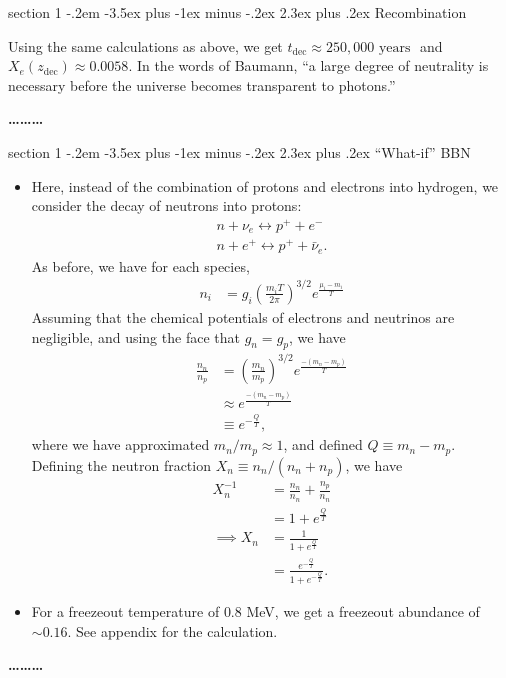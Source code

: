 \documentclass[12pt]{article}
\makeatletter
\newenvironment{problem}{\@startsection
	{section}
	{1}
	{-.2em}
	{-3.5ex plus -1ex minus -.2ex}
	{2.3ex plus .2ex}
	{\pagebreak[3]%
		\large\bf\noindent{Problem }
	}
}
{%
	\begin{center}\large\bf \ldots\ldots\ldots\end{center}}
\makeatother
\begin{document}
\begin{problem}{Recombination}
\begin{enumerate}
			Using the same calculations as above, we get $\boxed{t_\mathrm{dec}\approx 250,000 \text{ years }}$ and $X_e(z_\mathrm{dec})\approx \boxed{0.0058}$.  In the words of Baumann, ``a large degree of neutrality is necessary before the universe becomes transparent to photons.''

		\end{enumerate} 
	\end{problem}
	
	\begin{problem}{``What-if'' BBN}

	\begin{itemize}
		\item Here, instead of the combination of protons and electrons into hydrogen, we consider the decay of neutrons into protons: \begin{align*}
			n + \nu_e \leftrightarrow p^+ + e^-
			\\
			n + e^+ \leftrightarrow p^+ + \bar{\nu}_e.
		\end{align*}  As before, we have for each species, \begin{align*}
			n_i &= g_i \left(\frac{m_i T}{2\pi}\right)^{3/2}e^\frac{\mu_i-m_i}{T}
		\end{align*}  Assuming that the chemical potentials of electrons and neutrinos are negligible, and using the face that $g_n = g_p$, we have \begin{align*}
			\frac{n_n}{n_p} &= \left(\frac{m_n}{m_p}\right)^{3/2}e^\frac{-(m_n - m_p)}{T}
			\\
			&\approx e^\frac{-(m_n - m_p)}{T}
			\\
			&\equiv e^{-\frac{Q}{T}},
		\end{align*} where we have approximated $m_n/m_p\approx 1$, and defined $Q\equiv m_n - m_p$.\\
		
		Defining the neutron fraction $X_n \equiv n_n/(n_n + n_p)$, we have \begin{align*}
			X_n^{-1} &= \frac{n_n}{n_n} + \frac{n_p}{n_n}
			\\
			&= 1 +  e^{\frac{Q}{T}}
			\\
			\implies X_n &= \frac{1}{1 +  e^{\frac{Q}{T}}}
			\\
			&= \frac{ e^{-\frac{Q}{T}}}{1 +  e^{-\frac{Q}{T}}}.
		\end{align*}
		
		\item For a freezeout temperature of $0.8$ MeV, we get a freezeout abundance of $\sim \boxed{0.16}$.  See appendix for the calculation.
		

\end{itemize}
\end{problem}
\end{document}
